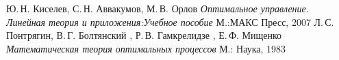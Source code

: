 \documentclass[11pt]{article}
\begin{document}
\newpage
\begin{thebibliography}{0}
Ю.\,Н. Киселев, С.\,Н. Аввакумов, М.\,В. Орлов \emph{Оптимальное управление. Линейная теория и приложения:Учебное пособие} М.:МАКС Пресс, 2007
Л.\,С. Понтрягин, В.\,Г. Болтянский , Р.\,В. Гамкрелидзе , Е.\,Ф. Мищенко \emph{Математическая теория оптимальных процессов} М.: Наука, 1983
\end{thebibliography}
\end{document}
